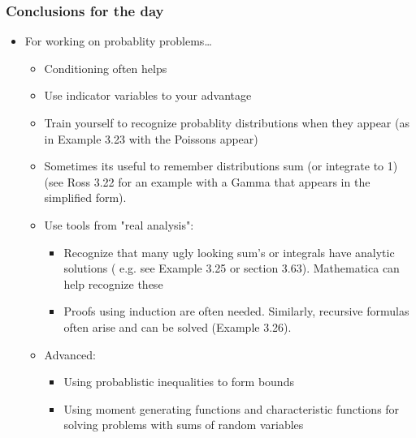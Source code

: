 \documentclass[12pt]{report}
\begin{document}
\subsubsection*{Conclusions for the day}
\label{sec-1-1-8}
\begin{itemize}
\item For working on probablity problems\ldots{}
\label{sec-1-1-8-1}
\begin{itemize}
\item Conditioning often helps
\label{sec-1-1-8-1-1}
\item Use indicator variables to your advantage
\label{sec-1-1-8-1-2}
\item Train yourself to recognize probablity distributions when they appear (as in Example 3.23 with the Poissons appear)
\label{sec-1-1-8-1-3}
\item Sometimes its useful to remember distributions sum (or integrate to 1) (see Ross 3.22 for an example with a Gamma that appears in the simplified form).
\label{sec-1-1-8-1-4}
\item Use tools from "real analysis":
\label{sec-1-1-8-1-5}
\begin{itemize}
\item Recognize that many ugly looking sum's or integrals have analytic solutions ( e.g. see Example 3.25 or section 3.63). Mathematica can help recognize these
\label{sec-1-1-8-1-5-1}
\item Proofs using induction are often needed.  Similarly, recursive formulas often arise and can be solved (Example 3.26).
\label{sec-1-1-8-1-5-2}
\end{itemize}
\item Advanced:
\label{sec-1-1-8-1-6}
\begin{itemize}
\item Using probablistic inequalities to form bounds
\item Using moment generating functions and characteristic functions for solving
problems with sums of random variables
\end{itemize}
\end{itemize}
\end{itemize}
\end{document}
